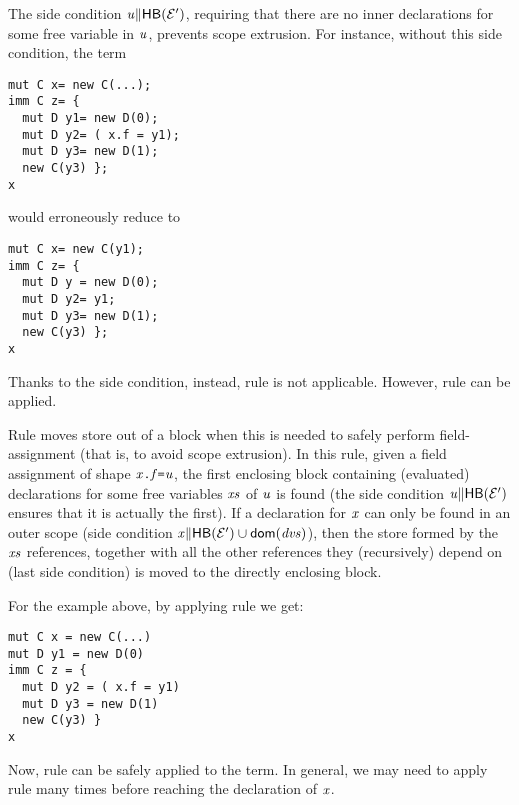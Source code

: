 The side condition {$\mathit{u}{\parallel}\textsf{HB}({\cal{E}'})$}, requiring that there are no inner declarations for some free variable in $\mathit{u}$, prevents scope extrusion. For instance, without this side condition, the term

\begin{small}
\begin{lstlisting}
mut C x= new C(...);
imm C z= { 
  mut D y1= new D(0);
  mut D y2= ( x.f = y1);
  mut D y3= new D(1);
  new C(y3) };
x
\end{lstlisting}
\end{small}

would erroneously reduce to 

\begin{small}
\begin{lstlisting}
mut C x= new C(y1); 
imm C z= { 
  mut D y = new D(0);
  mut D y2= y1;
  mut D y3= new D(1);
  new C(y3) };
x
\end{lstlisting}
\end{small}
Thanks to the side condition, instead, rule  is not applicable. However, 
rule  can be applied.

Rule  moves store out of a block when this is needed to safely perform field-assignment (that is, to avoid scope extrusion).
In this rule,  given a field assignment of shape $\mathit{x}\texttt{.}\mathit{f}\texttt{=}\mathit{u}$, the first enclosing block containing (evaluated) declarations for some free variables $\mathit{xs}$  of $\mathit{u}$ is found (the side condition {$\mathit{u}{\parallel}\textsf{HB}({\cal{E}'})$} ensures that it is actually the first). If a declaration for $\mathit{x}$ can only be found in an outer scope (side condition {$\mathit{x}{\parallel}\textsf{HB}({\cal{E}'})\cup\textsf{dom}(\mathit{dvs})$}), then the store formed by the $\mathit{xs}$ references, together with all the other references they (recursively) depend on (last side condition) is moved to the directly enclosing block.

For the example above, by applying rule  we get:

\begin{small}
\begin{lstlisting}
mut C x = new C(...)  
mut D y1 = new D(0)
imm C z = { 
  mut D y2 = ( x.f = y1)
  mut D y3 = new D(1)
  new C(y3) }  
x
\end{lstlisting}
\end{small}
Now, rule  can be safely applied to the term.
In general, we may need to apply rule  many times before reaching the declaration of $\mathit{x}$. 


